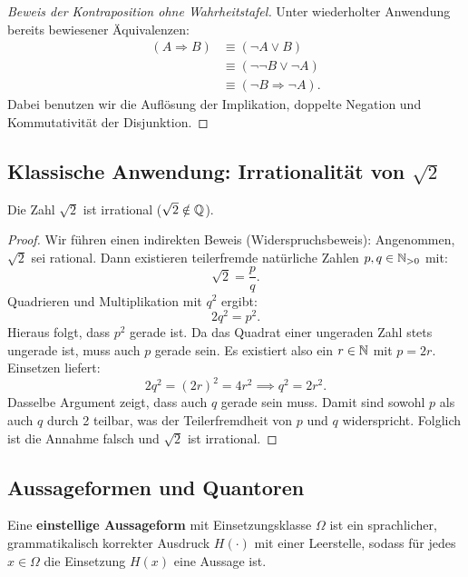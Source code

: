 \begin{proof}[Beweis der Kontraposition ohne Wahrheitstafel]
Unter wiederholter Anwendung bereits bewiesener Äquivalenzen:
\begin{align*}
    (A\Rightarrow B)&\equiv(\neg A\lor B)\\
    &\equiv(\neg\neg B\lor\neg A)\\
    &\equiv(\neg B\Rightarrow\neg A).
\end{align*}
Dabei benutzen wir die Auflösung der Implikation, doppelte Negation und
Kommutativität der Disjunktion.
\end{proof}

\subsection*{Klassische Anwendung: Irrationalität von \texorpdfstring{$\sqrt{2}$}{sqrt(2)}}

\begin{satz}
Die Zahl $\sqrt{2}$ ist irrational ($\sqrt{2} \notin \mathbb{Q}$).
\end{satz}

\begin{proof}
Wir führen einen indirekten Beweis (Widerspruchsbeweis): Angenommen, $\sqrt{2}$ sei rational. Dann existieren teilerfremde natürliche Zahlen $p, q \in \mathbb{N}_{>0}$ mit:
\[
\sqrt{2} = \frac{p}{q}.
\]
Quadrieren und Multiplikation mit $q^2$ ergibt:
\[
2q^2 = p^2.
\]
Hieraus folgt, dass $p^2$ gerade ist. Da das Quadrat einer ungeraden Zahl stets ungerade ist, muss auch $p$ gerade sein. Es existiert also ein $r \in \mathbb{N}$ mit $p = 2r$. Einsetzen liefert:
\[
2q^2 = (2r)^2 = 4r^2 \implies q^2 = 2r^2.
\]
Dasselbe Argument zeigt, dass auch $q$ gerade sein muss. 
Damit sind sowohl $p$ als auch $q$ durch 2 teilbar, was der Teilerfremdheit von $p$ und $q$ widerspricht. Folglich ist die Annahme falsch und $\sqrt{2}$ ist irrational.
\end{proof}

\subsection{Aussageformen und Quantoren}

\begin{definition}[Aussageform]
Eine \textbf{einstellige Aussageform} mit Einsetzungsklasse $\Omega$ ist ein sprachlicher, grammatikalisch korrekter Ausdruck $H(\cdot)$ mit einer Leerstelle, sodass für jedes $x \in \Omega$ die Einsetzung $H(x)$ eine Aussage ist.
\end{definition}

